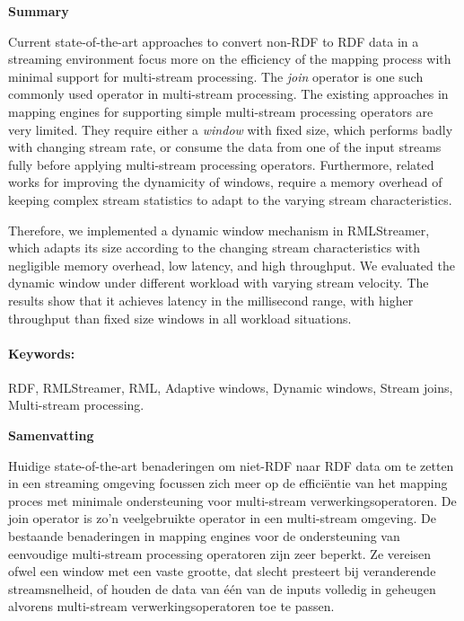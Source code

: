 \newpage
{}
{}
\noindent \textbf{\huge Summary}

\vspace{1.5cm}
Current state-of-the-art approaches to convert non-RDF to RDF data in 
a streaming environment focus more on the efficiency of the 
mapping process with minimal support for multi-stream processing. 
The \emph{join} operator is one such commonly used operator in multi-stream processing. 
The existing approaches in mapping engines for supporting simple multi-stream processing operators
are very limited.
They require either a \emph{window} with fixed size, which performs badly with 
changing stream rate, or consume the data from 
one of the input streams fully before applying multi-stream processing operators.
Furthermore, related works for improving the dynamicity of windows, 
require a memory overhead of keeping complex stream statistics to adapt 
to the varying stream characteristics.

Therefore, we implemented a dynamic window mechanism in RMLStreamer, which 
adapts its size according to the changing stream characteristics with
negligible memory overhead, low latency, and high throughput. We evaluated the dynamic window
under different workload with varying stream velocity. The results 
show that it achieves latency in the millisecond range, with higher 
throughput than fixed size windows in all workload situations. 

\paragraph{Keywords:}

RDF, RMLStreamer, RML, Adaptive windows, Dynamic windows,
Stream joins, Multi-stream processing.


\newpage
\noindent \textbf{\huge Samenvatting}

\vspace{1.5cm}
Huidige state-of-the-art benaderingen om niet-RDF naar RDF data om te zetten
in een streaming omgeving focussen zich meer op de efficiëntie van het 
mapping proces met minimale ondersteuning voor multi-stream verwerkingsoperatoren.
De join operator is zo'n veelgebruikte operator in een multi-stream omgeving.
De bestaande benaderingen in mapping engines voor de ondersteuning van 
eenvoudige multi-stream processing operatoren zijn zeer beperkt.
Ze vereisen ofwel een window met een vaste grootte, dat slecht presteert bij 
veranderende streamsnelheid, of houden de data van één van de inputs 
volledig in geheugen alvorens multi-stream verwerkingsoperatoren toe te passen.

